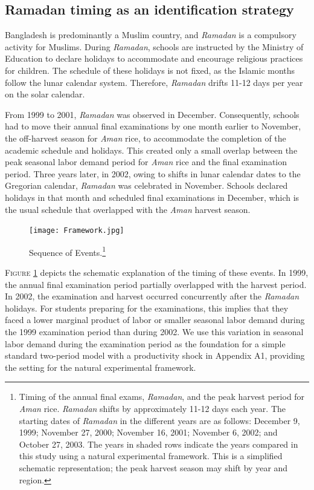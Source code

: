 \documentclass[12pt,letterpaper]{article}
\newcommand{\0}{\ensuremath{\mbox{\boldmath $0$}}}
\begin{document}
\subsection{Ramadan timing as an identification strategy}

Bangladesh is predominantly a Muslim country, and \textit{Ramadan} is a compulsory activity for Muslims. During \textit{Ramadan}, schools are instructed by the Ministry of Education to declare holidays to accommodate and encourage religious practices for children. The schedule of these holidays is not fixed, as the Islamic months follow the lunar calendar system. Therefore, \textit{Ramadan} drifts 11-12 days per year on the solar calendar. 

From 1999 to 2001, \textit{Ramadan} was observed in December. Consequently, schools had to move their annual final examinations by one month earlier to November, the off-harvest season for \textit{Aman} rice, to accommodate the completion of the academic schedule and holidays. This created only a small overlap between the peak seasonal labor demand period for \textit{Aman} rice and the final examination period. Three years later, in 2002, owing to shifts in lunar calendar dates to the Gregorian calendar, \textit{Ramadan} was celebrated in November. Schools declared holidays in that month and scheduled final examinations in December, which is the usual schedule that overlapped with the \textit{Aman} harvest season. 


\begin{figure}[h!]
\centering
\texttt{[image: Framework.jpg]}\\
\caption{Sequence of Events.\footnote{Timing of the annual final exams, \textit{Ramadan}, and the peak harvest period for \textit{Aman} rice. \textit{Ramadan} shifts by approximately 11-12 days each year. The starting dates of \textit{Ramadan} in the different years are as follows: December 9, 1999; November 27, 2000; November 16, 2001; November 6, 2002; and October 27, 2003. The years in shaded rows indicate the years compared in this study using a natural experimental framework. This is a simplified schematic representation; the peak harvest season may shift by year and region.}}
\label{schedule}
\end{figure}

\textsc{\small Figure \ref{schedule}} depicts the schematic explanation of the timing of these events. In 1999, the annual final examination period partially overlapped with the harvest period. In 2002, the examination and harvest occurred concurrently after the \textit{Ramadan} holidays. For students preparing for the examinations, this implies that they faced a lower marginal product of labor or smaller seasonal labor demand during the 1999 examination period than during 2002. We use this variation in seasonal labor demand during the examination period as the foundation for a simple standard two-period model with a productivity shock in Appendix A1, providing the setting for the natural experimental framework.
\end{document}
